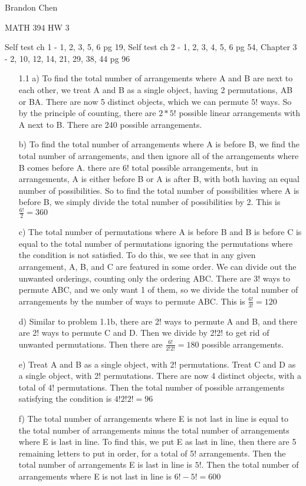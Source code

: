 \documentclass[11pt]{article}
\begin{document}
\noindent Brandon Chen

\noindent MATH 394 HW 3

\noindent Self test ch 1 - 1, 2, 3, 5, 6 pg 19, Self test ch 2 - 1, 2, 3, 4, 5, 6 pg 54, Chapter 3 - 2, 10, 12, 14, 21, 29, 38, 44 pg 96




\begin{itemize}
\item[1.1]
  a) To find the total number of arrangements where A and B are next to each other, we treat A and B as a single object, having 2 permutations, AB or BA. There are now 5 distinct objects, which we can permute $5!$ ways. So by the principle of counting, there are $2 * 5!$ possible linear arrangements with A next to B. There are 240 possible arrangements.

  b) To find the total number of arrangements where A is before B, we find the total number of arrangements, and then ignore all of the arrangements where B comes before A. there are $6!$ total possible arrangements, but in arrangements, A is either before B or A is after B, with both having an equal number of possibilities. So to find the total number of possibilities where A is before B, we simply divide the total number of possibilities by 2. This is $\frac{6!}{2} = 360$

  c) The total number of permutations where A is before B and B is before C is equal to the total number of permutations ignoring the permutations where the condition is not satisfied. To do this, we see that in any given arrangement, A, B, and C are featured in some order. We can divide out the unwanted orderings, counting only the ordering ABC. There are $3!$ ways to permute ABC, and we only want 1 of them, so we divide the total number of arrangements by the number of ways to permute ABC. This is $\frac{6!}{3!} = 120$  

  d) Similar to problem 1.1b, there are 2! ways to permute A and B, and there are 2! ways to permute C and D. Then we divide by 2!2! to get rid of unwanted permutations. Then there are $\frac{6!}{2!2!} = 180$ possible arrangements.

  e) Treat A and B as a single object, with 2! permutations. Treat C and D as a single object, with 2! permutations. There are now 4 distinct objects, with a total of 4! permutations. Then the total number of possible arrangements satisfying the condition is $4!2!2! = 96$

  f) The total number of arrangements where E is not last in line is equal to the total number of arrangements minus the total number of arrangements where E is last in line. To find this, we put E as last in line, then there are 5 remaining letters to put in order, for a total of 5! arrangements. Then the total number of arrangements E is last in line is $5!$. Then the total number of arrangements where E is not last in line is $6! - 5! = 600$


\end{itemize}
\end{document}
